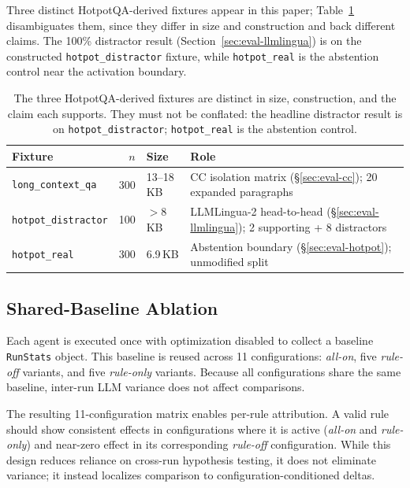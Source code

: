 Three distinct HotpotQA-derived fixtures appear in this paper; Table~\ref{tab:fixtures}
disambiguates them, since they differ in size and construction and back different
claims. The 100\% distractor result (Section~\ref{sec:eval-llmlingua}) is on the
constructed \texttt{hotpot\_distractor} fixture, while \texttt{hotpot\_real} is the
abstention control near the activation boundary.

\begin{table}[t]
\caption{The three HotpotQA-derived fixtures are distinct in size, construction, and
the claim each supports. They must not be conflated: the headline distractor result is
on \texttt{hotpot\_distractor}; \texttt{hotpot\_real} is the abstention control.}
\label{tab:fixtures}
\footnotesize
\begin{tabularx}{\columnwidth}{@{} l r l X @{}}
\toprule
Fixture & $n$ & Size & Role \\
\midrule
\texttt{long\_context\_qa}  & 300 & 13--18\,KB & CC isolation matrix (\S\ref{sec:eval-cc}); 20 expanded paragraphs \\
\texttt{hotpot\_distractor} & 100 & $>$8\,KB   & LLMLingua-2 head-to-head (\S\ref{sec:eval-llmlingua}); 2 supporting + 8 distractors \\
\texttt{hotpot\_real}       & 300 & 6.9\,KB    & Abstention boundary (\S\ref{sec:eval-hotpot}); unmodified split \\
\bottomrule
\end{tabularx}
\end{table}

\subsection{Shared-Baseline Ablation}

Each agent is executed once with optimization disabled to collect a baseline
\texttt{RunStats} object. This baseline is reused across 11 configurations:
\textit{all-on}, five \textit{rule-off} variants, and five \textit{rule-only}
variants. Because all configurations share the same baseline, inter-run LLM variance
does not affect comparisons.

The resulting 11-configuration matrix enables per-rule attribution. A valid rule
should show consistent effects in configurations where it is active (\textit{all-on}
and \textit{rule-only}) and near-zero effect in its corresponding \textit{rule-off}
configuration. While this design reduces reliance on cross-run hypothesis testing, it
does not eliminate variance; it instead localizes comparison to
configuration-conditioned deltas.

